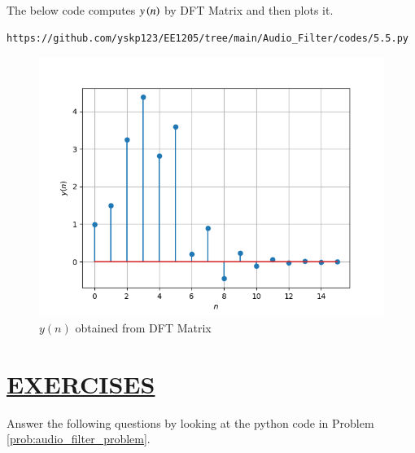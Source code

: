 \documentclass[journal,12pt,twocolumn]{IEEEtran}
\theoremstyle{remark}
\begin{document}
The below code computes $y\left(n\right)$ by DFT Matrix and then plots it.
\begin{lstlisting}
https://github.com/yskp123/EE1205/tree/main/Audio_Filter/codes/5.5.py
\end{lstlisting}
\begin{figure}[H]
\centering
\includegraphics[width=\columnwidth]{figs/yn_DFT_matrix.png}
\caption{$y(n)$ obtained from DFT Matrix}
\label{fig:yn_DFT_matrix}
\end{figure}



\section{\underline{EXERCISES}}
\noindent Answer the following questions by looking at the python code in Problem \ref{prob:audio_filter_problem}.
\end{document}
